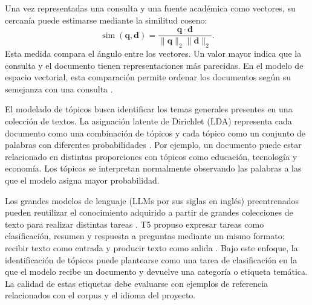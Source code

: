 \documentclass[conference]{IEEEtran}
\begin{document}
Una vez representadas una consulta y una fuente académica como vectores, su cercanía puede estimarse mediante la similitud coseno:
\begin{equation}
\operatorname{sim}(\mathbf{q},\mathbf{d})=
\frac{\mathbf{q}\cdot\mathbf{d}}
{\lVert\mathbf{q}\rVert_2\lVert\mathbf{d}\rVert_2}.
\end{equation}
Esta medida compara el ángulo entre los vectores. Un valor mayor indica que la consulta y el documento tienen representaciones más parecidas. En el modelo de espacio vectorial, esta comparación permite ordenar los documentos según su semejanza con una consulta \cite{salton1975}.

El modelado de tópicos busca identificar los temas generales presentes en una colección de textos. La asignación latente de Dirichlet (LDA) representa cada documento como una combinación de tópicos y cada tópico como un conjunto de palabras con diferentes probabilidades \cite{blei2003}. Por ejemplo, un documento puede estar relacionado en distintas proporciones con tópicos como educación, tecnología y economía. Los tópicos se interpretan normalmente observando las palabras a las que el modelo asigna mayor probabilidad.

Los grandes modelos de lenguaje (LLMs por sus siglas en inglés) preentrenados pueden reutilizar el conocimiento adquirido a partir de grandes colecciones de texto para realizar distintas tareas \cite{gpt2}. T5 propuso expresar tareas como clasificación, resumen y respuesta a preguntas mediante un mismo formato: recibir texto como entrada y producir texto como salida \cite{raffel2020}. Bajo este enfoque, la identificación de tópicos puede plantearse como una tarea de clasificación en la que el modelo recibe un documento y devuelve una categoría o etiqueta temática. La calidad de estas etiquetas debe evaluarse con ejemplos de referencia relacionados con el corpus y el idioma del proyecto.


\end{document}
